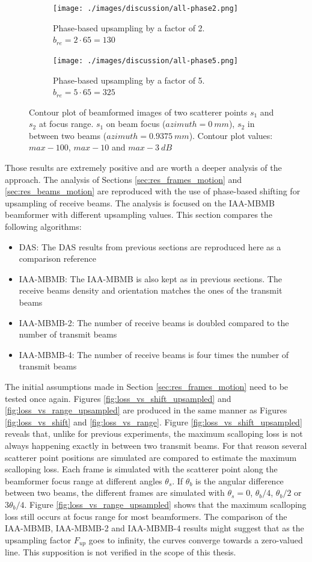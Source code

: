\begin{figure}[ht]
    \centering
    \begin{subfigure}[t]{0.48\linewidth}
        \texttt{[image: ./images/discussion/all-phase2.png]}
        \caption{Phase-based upsampling by a factor of 2. $b_{re} = 2 \cdot 65 = 130$}
    \end{subfigure}
    \quad
    \begin{subfigure}[t]{0.48\linewidth}
        \texttt{[image: ./images/discussion/all-phase5.png]}
        \caption{Phase-based upsampling by a factor of 5. $b_{re} = 5 \cdot 65 =  325$}
    \end{subfigure}
\caption{Contour plot of beamformed images of two scatterer points $s_1$ and $s_2$ at focus range. $s_1$ on beam focus ($azimuth = 0~mm$), $s_2$ in between two beams ($azimuth = 0.9375~mm$). Contour plot values: $max-100$, $max-10$ and $max-3~dB$}
\label{fig:phase_upsampling}
\end{figure}
Those results are extremely positive and are worth a deeper analysis of the approach. The analysis of Sections \ref{sec:res_frames_motion} and \ref{sec:res_beams_motion} are reproduced with the use of phase-based shifting for upsampling of receive beams. The analysis is focused on the IAA-MBMB beamformer with different upsampling values. This section compares the following algorithms:
\begin{itemize}
    \item DAS: The DAS results from previous sections are reproduced here as a comparison reference
    \item IAA-MBMB: The IAA-MBMB is also kept as in previous sections. The receive beams density and orientation matches the ones of the transmit beams
    \item IAA-MBMB-2: The number of receive beams is doubled compared to the number of transmit beams
    \item IAA-MBMB-4: The number of receive beams is four times the number of transmit beams
\end{itemize}
\noindent
The initial assumptions made in Section \ref{sec:res_frames_motion} need to be tested once again. Figures \ref{fig:loss_vs_shift_upsampled} and \ref{fig:loss_vs_range_upsampled} are produced in the same manner as Figures \ref{fig:loss_vs_shift} and \ref{fig:loss_vs_range}. Figure \ref{fig:loss_vs_shift_upsampled} reveals that, unlike for previous experiments, the maximum scalloping loss is not always happening exactly in between two transmit beams. For that reason several scatterer point positions are simulated are compared to estimate the maximum scalloping loss. Each frame is simulated with the scatterer point along the beamformer focus range at different angles $\theta_s$. If $\theta_b$ is the angular difference between two beams, the different frames are simulated with $\theta_s = 0$, $\theta_b / 4$, $\theta_b / 2$ or $3 \theta_b / 4$.
Figure \ref{fig:loss_vs_range_upsampled} shows that the maximum scalloping loss still occurs at focus range for most beamformers. The comparison of the IAA-MBMB, IAA-MBMB-2 and IAA-MBMB-4 results might suggest that as the upsampling factor $F_{up}$ goes to infinity, the curves converge towards a zero-valued line. This supposition is not verified in the scope of this thesis.

